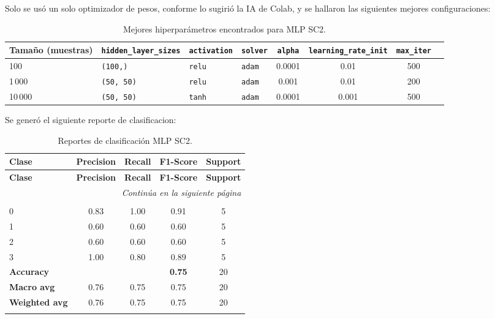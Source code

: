 \documentclass[12pt,a4paper]{article}
\begin{document}
\begin{enumerate}
  Solo se usó un solo optimizador de pesos, conforme lo sugirió la IA de Colab, y se hallaron las siguientes mejores 
  configuraciones:

  \begin{table}[H]
    \centering\small
    \setlength{\tabcolsep}{4pt}
    \begin{adjustbox}{max width=\linewidth}
      \begin{tabular}{@{}l l l l c c c c@{}}
        \toprule
        \textbf{Tamaño (muestras)} & \texttt{hidden\_layer\_sizes} & \texttt{activation} & \texttt{solver} & \texttt{alpha} & \texttt{learning\_rate\_init} & \texttt{max\_iter}\\
        \midrule
        100      & \texttt{(100,)}    & \texttt{relu} & \texttt{adam} & 0.0001 & 0.01  & 500\\
        1\,000   & \texttt{(50, 50)}  & \texttt{relu} & \texttt{adam} & 0.001  & 0.01  & 200\\
        10\,000  & \texttt{(50, 50)}  & \texttt{tanh} & \texttt{adam} & 0.0001 & 0.001 & 500\\
        \bottomrule
      \end{tabular}
    \end{adjustbox}
    \caption{Mejores hiperparámetros encontrados para MLP SC2.}
    \label{tab:best_hparams_mlp_sc2}
  \end{table}

  Se generó el siguiente reporte de clasificacion:
  
  \small
  \setlength{\tabcolsep}{4pt}
  \begin{longtable}{@{}lcccc@{}}
    \toprule
    \textbf{Clase} & \textbf{Precision} & \textbf{Recall} & \textbf{F1-Score} & \textbf{Support} \\
    \midrule
    \endfirsthead

    \toprule
    \textbf{Clase} & \textbf{Precision} & \textbf{Recall} & \textbf{F1-Score} & \textbf{Support} \\
    \midrule
    \endhead

    \midrule
    \multicolumn{5}{r}{\emph{Continúa en la siguiente página}} \\
    \endfoot

    \bottomrule
    \caption{Reportes de clasificación MLP SC2.}
    \label{tab:mlp_reports_by_size}
    \endlastfoot

    \multicolumn{5}{@{}l}{\textbf{(a) 100 muestras}}\\
    0 & 0.83 & 1.00 & 0.91 & 5 \\
    1 & 0.60 & 0.60 & 0.60 & 5 \\
    2 & 0.60 & 0.60 & 0.60 & 5 \\
    3 & 1.00 & 0.80 & 0.89 & 5 \\
    \midrule
    \multicolumn{3}{l}{\textbf{Accuracy}} & \textbf{0.75} & 20 \\
    \textbf{Macro avg}    & 0.76 & 0.75 & 0.75 & 20 \\
    \textbf{Weighted avg} & 0.76 & 0.75 & 0.75 & 20 \\
    \addlinespace[0.8em]


\end{longtable}
\end{enumerate}
\end{document}
